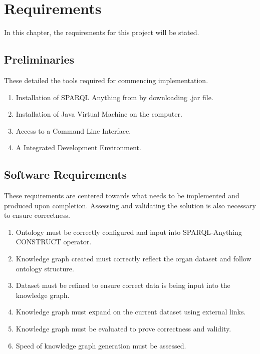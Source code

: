 \chapter{Requirements}
In this chapter, the requirements for this project will be stated. 

\section{Preliminaries}
\hspace{0.5cm} These detailed the tools required for commencing implementation.
\begin{enumerate}
\item Installation of SPARQL Anything from \cite{sparqlanythinggithub} by downloading .jar file.
\item Installation of Java Virtual Machine on the computer. 
\item Access to a Command Line Interface.
\item A Integrated Development Environment.
\end{enumerate}

\section{Software Requirements}
\hspace{0.5cm} These requirements are centered towards what needs to be implemented and produced upon completion. Assessing and validating the solution is also necessary to ensure correctness.
\begin{enumerate}
\item Ontology must be correctly configured and input into SPARQL-Anything CONSTRUCT operator.
\item Knowledge graph created must correctly reflect the organ dataset and follow ontology structure.
\item Dataset must be refined to ensure correct data is being input into the knowledge graph.
\item Knowledge graph must expand on the current dataset using external links.
\item Knowledge graph must be evaluated to prove correctness and validity.
\item Speed of knowledge graph generation must be assessed.
\end{enumerate}

